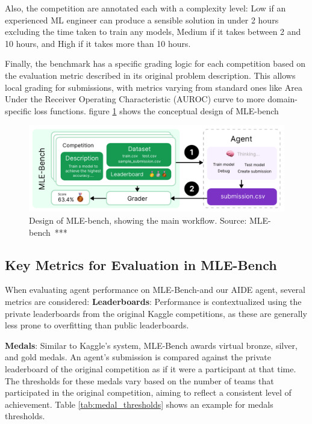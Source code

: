 Also, the competition are annotated each with a complexity level: Low if
an experienced ML engineer can produce a sensible solution in under 2 hours excluding
the time taken to train any models, Medium if it takes between 2 and 10 hours, and High if it takes
more than 10 hours.

Finally, the benchmark has a specific grading logic for each competition based on the evaluation metric described in its original problem description. This allows local grading for submissions, with metrics varying from standard ones like Area Under the Receiver Operating Characteristic (AUROC) curve to more domain-specific loss functions. figure \ref{fig:mlebench-design} shows the conceptual design of MLE-bench
\begin{figure}
    \centering
    \includegraphics[width=0.75\linewidth]{images/mlebench-design.png}
    \caption{Design of MLE-bench, showing the main workflow. Source: MLE-bench~\cite{AD92}***}
    \label{fig:mlebench-design}
\end{figure}

\subsection{Key Metrics for Evaluation in MLE-Bench}
When evaluating agent performance on MLE-Bench-and our AIDE agent, several metrics are considered:
\textbf{Leaderboards}: Performance is contextualized using the private leaderboards from the original Kaggle competitions, as these are generally less prone to overfitting than public leaderboards.

\textbf{Medals}: Similar to Kaggle's system, MLE-Bench awards virtual bronze, silver, and gold medals. An agent's submission is compared against the private leaderboard of the original competition as if it were a participant at that time. The thresholds for these medals vary based on the number of teams that participated in the original competition, aiming to reflect a consistent level of achievement. 
Table \ref{tab:medal_thresholds} shows an example for medals thresholds.

